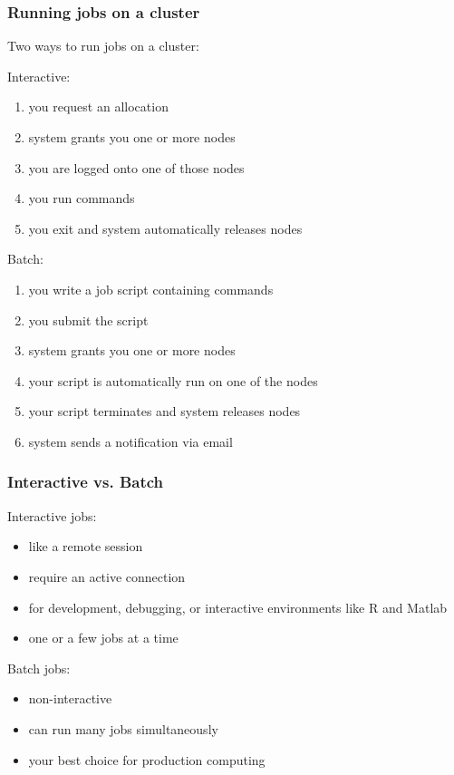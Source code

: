 \documentclass[10pt]{beamer}
\begin{document}
\begin{frame}[fragile]
\frametitle{Running jobs on a cluster}

Two ways to run jobs on a cluster:

Interactive:
\begin{enumerate}
\item you request an allocation
\item system grants you one or more nodes
\item you are logged onto one of those nodes
\item you run commands
\item you exit and system automatically releases nodes
\end{enumerate}

Batch:
\begin{enumerate}
\item you write a job script containing commands
\item you submit the script
\item system grants you one or more nodes
\item your script is automatically run on one of the nodes
\item your script terminates and system releases nodes
\item system sends a notification via email
\end{enumerate}

\end{frame}

\begin{frame}[fragile]
\frametitle{Interactive vs. Batch}

Interactive jobs:
\begin{itemize}
\item like a remote session
\item require an active connection
\item for development, debugging, or 
interactive environments like R and Matlab
\item one or a few jobs at a time 
\end{itemize}
\vskip10pt

Batch jobs:
\begin{itemize}
\item non-interactive  
\item can run many jobs simultaneously
\item your best choice for production computing
\end{itemize}
\end{frame}
\end{document}
